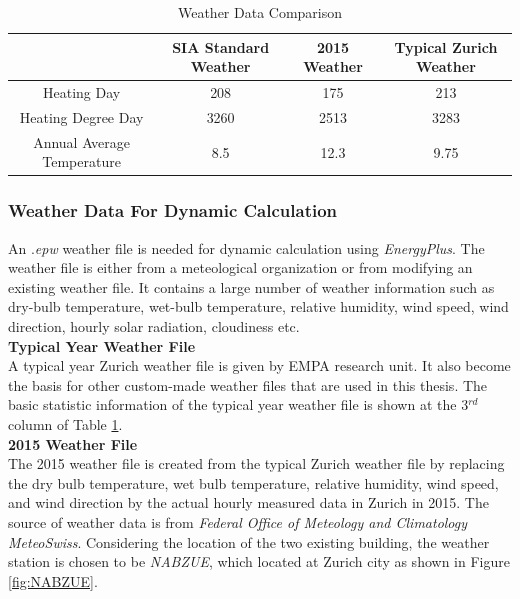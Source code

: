 \documentclass[11pt, a4paper]{article}
\theoremstyle{definition}
\begin{document}
				\begin{table}[htbp]
				  \centering
				\caption{Weather Data Comparison}
				    \begin{tabular}{|c|c|c|c|}
				    \toprule
				         & \multicolumn{1}{c}{SIA Standard Weather} & 2015 Weather & Typical Zurich Weather\\
				    \midrule
				    Heating Day & 208  & 175 & 213\\
				    \midrule
				    Heating Degree Day & 3260 & 2513 & 3283\\
				    \midrule
				    Annual Average Temperature & 8.5  & 12.3 & 9.75\\
				    \bottomrule
				    \end{tabular}%
				  \label{tab:StaticWeatherCompare}%
				\end{table}%


			\subsubsection{Weather Data For Dynamic Calculation}
				An .\textit{epw} weather file is needed for dynamic calculation using \textit{EnergyPlus}. The weather file is either from a meteological organization or from modifying an existing weather file. It contains a large number of weather information such as dry-bulb temperature, wet-bulb temperature, relative humidity, wind speed, wind direction, hourly solar radiation, cloudiness etc.\\

			\textbf{Typical Year Weather File}\\
				A typical year Zurich weather file is given by EMPA research unit. It also become the basis for other custom-made weather files that are used in this thesis. The basic statistic information of the typical year weather file is shown at the 3$^{rd}$ column of Table \ref{tab:StaticWeatherCompare}. \\

			\textbf{2015 Weather File}\\
				The 2015 weather file is created from the typical Zurich weather file by replacing the dry bulb temperature, wet bulb temperature, relative humidity, wind speed, and wind direction by the actual hourly measured data in Zurich in 2015. The source of weather data is from \textit{Federal Office of Meteology and Climatology MeteoSwiss}. Considering the location of the two existing building, the weather station is chosen to be \textit{NABZUE}, which located at Zurich city as shown in Figure \ref{fig:NABZUE}.
\end{document}
